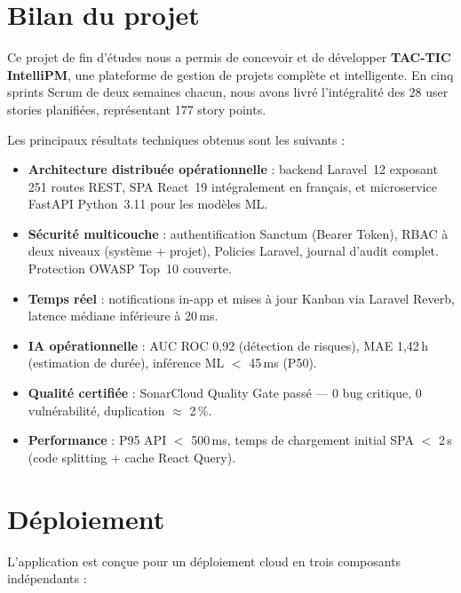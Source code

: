 \section*{Bilan du projet}

Ce projet de fin d'études nous a permis de concevoir et de développer
\textbf{TAC-TIC IntelliPM}, une plateforme de gestion de projets complète et
intelligente. En cinq sprints Scrum de deux semaines chacun, nous avons livré
l'intégralité des 28 user stories planifiées, représentant 177 story points.

\medskip
Les principaux résultats techniques obtenus sont les suivants :

\begin{itemize}
  \item \textbf{Architecture distribuée opérationnelle} : backend Laravel~12
        exposant 251 routes REST, SPA React~19 intégralement en français, et
        microservice FastAPI Python~3.11 pour les modèles ML.
  \item \textbf{Sécurité multicouche} : authentification Sanctum (Bearer Token),
        RBAC à deux niveaux (système + projet), Policies Laravel, journal d'audit
        complet. Protection OWASP Top~10 couverte.
  \item \textbf{Temps réel} : notifications in-app et mises à jour Kanban via
        Laravel Reverb, latence médiane inférieure à 20\,ms.
  \item \textbf{IA opérationnelle} : AUC ROC 0,92 (détection de risques),
        MAE 1,42\,h (estimation de durée), inférence ML $<$ 45\,ms (P50).
  \item \textbf{Qualité certifiée} : SonarCloud Quality Gate passé --- 0 bug
        critique, 0 vulnérabilité, duplication $\approx$ 2\,\%.
  \item \textbf{Performance} : P95 API $<$ 500\,ms, temps de chargement initial
        SPA $<$ 2\,s (code splitting + cache React Query).
\end{itemize}

\section*{Déploiement}

L'application est conçue pour un déploiement cloud en trois composants indépendants :

